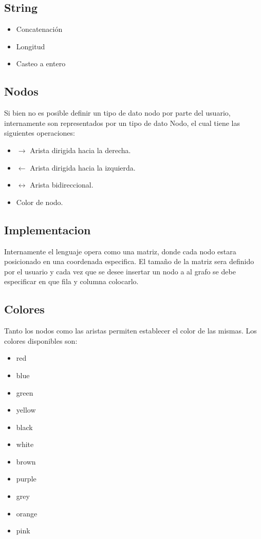 \documentclass{article}
\begin{document}
	\subsection{String}
	\begin{itemize}
		\item Concatenación
	    \item Longitud
	    \item Casteo a entero
	\end{itemize}
    \subsection{Nodos}
    Si bien no es posible definir un tipo de dato nodo por parte del usuario, 
    internamente son representados por un tipo de dato Nodo, el cual tiene las siguientes operaciones:
    \begin{itemize}
       \item{$\rightarrow$ Arista dirigida hacia la derecha.}
       \item{$\leftarrow$ Arista dirigida hacia la izquierda.}
       \item{$\leftrightarrow$ Arista bidireccional.}
       \item Color de nodo.
    \end{itemize}
    \subsection{Implementacion}
    Internamente el lenguaje opera como una matriz, donde cada nodo estara posicionado en una coordenada especifica.
    El tamaño de la matriz sera definido por el usuario y cada vez que se desee insertar un nodo a al grafo se debe
    especificar en que fila y columna colocarlo.
    \subsection{Colores}
    Tanto los nodos como las aristas permiten establecer el color de las mismas. Los colores disponibles son:
    \begin{itemize}
        \color{red}
        \item red
        \color{blue}
        \item blue
        \color{green}
        \item green
        \color{yellow}
        \item yellow
        \color{black}
        \item black
        \color{black}
        \item white
        \color{brown}
        \item brown
        \color{purple}
        \item purple
        \color{gray}
        \item grey
        \color{orange}
        \item orange
        \color{pink}
        \item pink
    \end{itemize}
\end{document}
